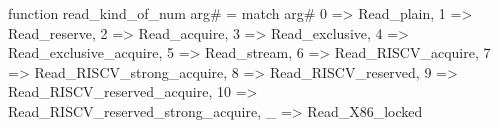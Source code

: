 function read_kind_of_num arg# = match arg# {
  0 => Read_plain,
  1 => Read_reserve,
  2 => Read_acquire,
  3 => Read_exclusive,
  4 => Read_exclusive_acquire,
  5 => Read_stream,
  6 => Read_RISCV_acquire,
  7 => Read_RISCV_strong_acquire,
  8 => Read_RISCV_reserved,
  9 => Read_RISCV_reserved_acquire,
  10 => Read_RISCV_reserved_strong_acquire,
  _ => Read_X86_locked
}
